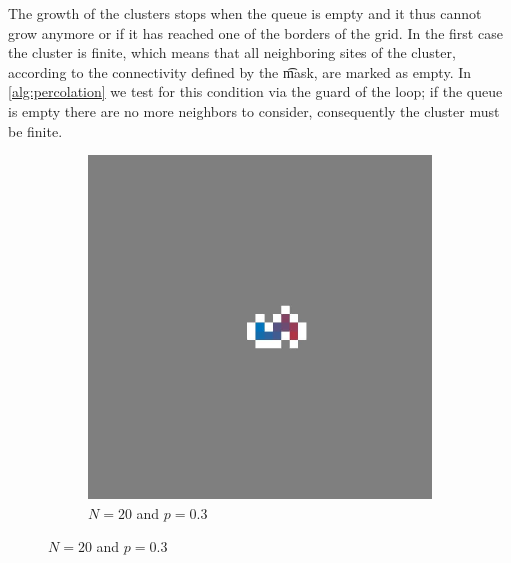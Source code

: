 The growth of the clusters stops when the queue is empty and it thus cannot grow anymore or if it has reached one of the borders of the grid. In the first case the cluster is finite, which means that all neighboring sites of the cluster, according to the connectivity defined by the \t{mask}, are marked as empty. In \cref{alg:percolation} we test for this condition via the guard of the loop; if the queue is empty there are no more neighbors to consider, consequently the cluster must be finite. 

\begin{figure}[t!]
	\centering	
	\begin{subfigure}{\columnwidth}
		\centering
		\includegraphics[width=\textwidth, height=0.225\textheight, keepaspectratio=true]{./img/fancy_cluster_N20_p3_rng_8}
		\caption{$N = 20$ and $p = 0.3$}
		\label{fig:method:fin_inf:finiteSmall}
	\end{subfigure}


\end{figure}
